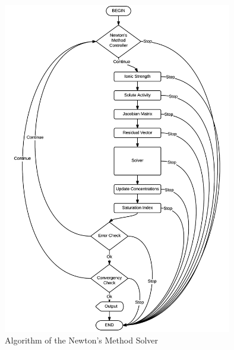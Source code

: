 \begin{figure}[ht!]
\centering
\includegraphics[width=100mm]{figures/Shpeck_algo_newton.png}
\caption{Algorithm of the Newton's Method Solver}
\label{fig:Shpeck-algo-newton}
\end{figure}



